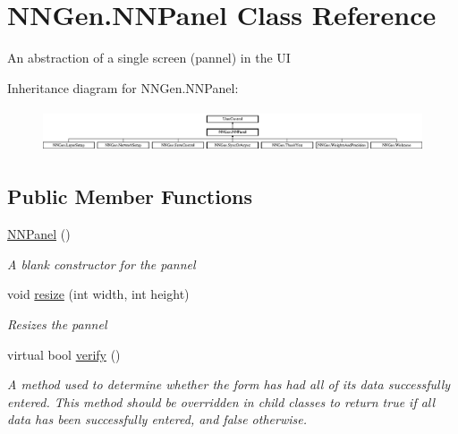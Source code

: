 \hypertarget{class_n_n_gen_1_1_n_n_panel}{}\section{N\+N\+Gen.\+N\+N\+Panel Class Reference}
\label{class_n_n_gen_1_1_n_n_panel}


An abstraction of a single screen (pannel) in the U\+I  


Inheritance diagram for N\+N\+Gen.\+N\+N\+Panel\+:\begin{figure}[H]
\begin{center}
\leavevmode
\includegraphics[height=1.297297cm]{class_n_n_gen_1_1_n_n_panel}
\end{center}
\end{figure}
\subsection*{Public Member Functions}
\begin{DoxyCompactItemize}
\item 
\hyperlink{class_n_n_gen_1_1_n_n_panel_abc0696f7f309efb402b07085676ca562}{N\+N\+Panel} ()
\begin{DoxyCompactList}\small\item\em A blank constructor for the pannel \end{DoxyCompactList}\item 
void \hyperlink{class_n_n_gen_1_1_n_n_panel_a593ac509de9ee22792c68900e8cf8843}{resize} (int width, int height)
\begin{DoxyCompactList}\small\item\em Resizes the pannel \end{DoxyCompactList}\item 
virtual bool \hyperlink{class_n_n_gen_1_1_n_n_panel_a36e3bcf90c9e561e8502eac6f884582a}{verify} ()
\begin{DoxyCompactList}\small\item\em A method used to determine whether the form has had all of its data successfully entered. This method should be overridden in child classes to return true if all data has been successfully entered, and false otherwise. \end{DoxyCompactList}\end{DoxyCompactItemize}
